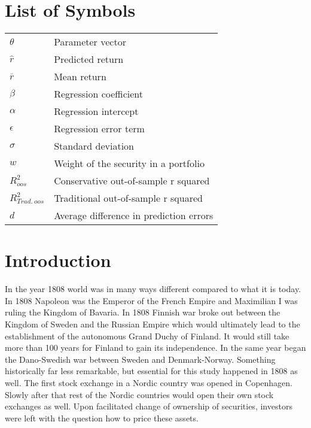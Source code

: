 \documentclass[12pt]{article}
\begin{document}
\section*{List of Symbols}
\begin{tabular}{l l}
$\theta$ & Parameter vector\\
$\hat{r}$ & Predicted return\\
$\overline{r}$ & Mean return\\
$\beta$ & Regression coefficient \\
$\alpha$ & Regression intercept\\
$\epsilon$ & Regression error term\\
$\sigma$ & Standard deviation\\
$w$ & Weight of the security in a portfolio\\
$R^2_{oos}$ & Conservative out-of-sample r squared \\
$R^2_{Trad. \ oos}$ & Traditional out-of-sample r squared \\
$d$ & Average difference in prediction errors \\
\end{tabular}

\newpage

\section{Introduction} \label{Introduction}
In the year 1808 world was in many ways different compared to what it is today. In 1808 Napoleon was the Emperor of the French Empire and Maximilian I was ruling the Kingdom of Bavaria. In 1808 Finnish war broke out between the Kingdom of Sweden and the Russian Empire which would ultimately lead to the establishment of the autonomous Grand Duchy of Finland. It would still take more than 100 years for Finland to gain its independence. In the same year began the Dano-Swedish war between Sweden and Denmark-Norway. Something historically far less remarkable, but essential for this study happened in 1808 as well. The first stock exchange in a Nordic country was opened in Copenhagen\footnotemark. Slowly after that rest of the Nordic countries would open their own stock exchanges as well. Upon facilitated change of ownership of securities, investors were left with the question how to price these assets. \par

\end{document}
